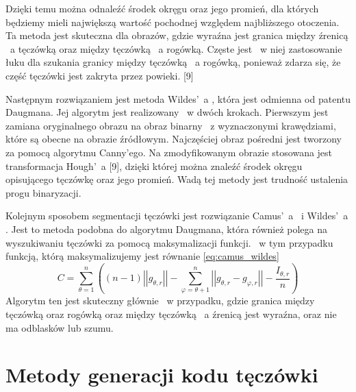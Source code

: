 Dzięki temu można odnaleźć środek okręgu oraz jego promień, dla których będziemy mieli największą wartość pochodnej względem najbliższego otoczenia. Ta metoda jest skuteczna dla obrazów, gdzie wyraźna jest granica między źrenicą ~a tęczówką oraz między tęczówką ~a rogówką. Częste jest ~w niej zastosowanie łuku dla szukania granicy między tęczówką ~a rogówką, ponieważ zdarza się, że część tęczówki jest zakryta przez powieki. [9]

Następnym rozwiązaniem jest metoda Wildes'~a \cite{Wildes}, która jest odmienna od patentu Daugmana. Jej algorytm jest realizowany ~w dwóch krokach. Pierwszym jest zamiana oryginalnego obrazu na obraz binarny ~z wyznaczonymi krawędziami, które są obecne na obrazie źródłowym. Najczęściej obraz pośredni jest tworzony za pomocą algorytmu Canny'ego. Na zmodyfikowanym obrazie stosowana jest transformacja Hough'~a [9], dzięki której można znaleźć środek okręgu opisującego tęczówkę oraz jego promień. Wadą tej metody jest trudność ustalenia progu binaryzacji.

Kolejnym sposobem segmentacji tęczówki jest rozwiązanie Camus'~a ~i Wildes'~a \cite{Camus}. Jest to metoda podobna do algorytmu Daugmana, która również polega na wyszukiwaniu tęczówki za pomocą maksymalizacji funkcji. ~w tym przypadku funkcją, którą maksymalizujemy jest równanie \ref{eq:camus_wildes} 
\begin{equation}
\label{eq:camus_wildes}
C=\sum_{\theta =1}^{n} ((n-1)\left|\left| g_{\theta,r} \right|\right| - \sum_{\varphi=\theta + 1 } ^{n} \left| \left| g_{\theta,r} - g_{\varphi,r} \right| \right| - \frac{I_{\theta,r}}{n}  )
\end{equation}
Algorytm ten jest skuteczny głównie ~w przypadku, gdzie granica między tęczówką oraz rogówką oraz między tęczówką ~a źrenicą jest wyraźna, oraz nie ma odblasków lub szumu.

\section{Metody generacji kodu tęczówki}
\label{sec:metodyGeneracjiKodu}

